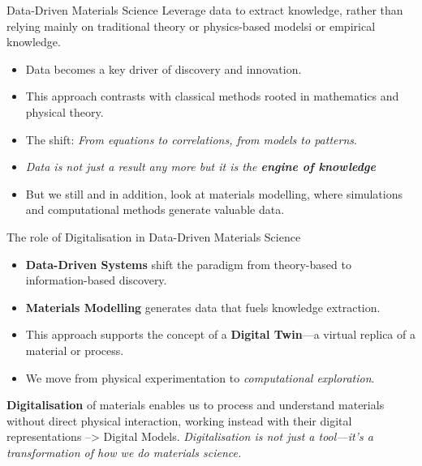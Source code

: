 \documentclass[aspectratio=169]{beamer}
\begin{document}
\begin{frame}{Data-Driven Materials Science}
    Leverage data to extract knowledge, rather than relying mainly on traditional theory or physics-based modelsi or empirical knowledge.

    \vspace{1em}
    \begin{itemize}
        \item Data becomes a key driver of discovery and innovation.
        \item This approach contrasts with classical methods rooted in {mathematics and physical theory}.
        \item The shift: \textit{From equations to correlations, from models to patterns}.
        \item \textit{Data is not just a result any more but it is the {\bf engine of knowledge}}
        \item But we still and in addition,  look at {materials modelling}, where simulations and computational methods generate valuable data.
    \end{itemize}

    \vspace{1em}
\end{frame}


\begin{frame}{The role of Digitalisation in Data-Driven Materials Science}

    \vspace{1em}
    \begin{itemize}
        \item \textbf{Data-Driven Systems} shift the paradigm from theory-based to information-based discovery.
        \item \textbf{Materials Modelling} generates data that fuels knowledge extraction.
        \item This approach supports the concept of a \textbf{Digital Twin}—a virtual replica of a material or process.
        \item We move from physical experimentation to \textit{computational exploration}.
    \end{itemize}

    \textbf{Digitalisation} of materials enables us to process and understand materials without direct physical interaction, working instead with their digital representations --> Digital Models.
    \vspace{1em}
    \textit{Digitalisation is not just a tool—it’s a transformation of how we do materials science.}
\end{frame}
\end{document}
